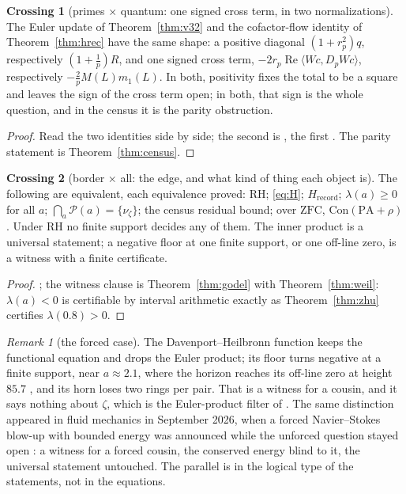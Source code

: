 \documentclass[11pt]{article}
\theoremstyle{definition}
\newtheorem{crossing}{Crossing}
\theoremstyle{remark}
\newtheorem{remark}[theorem]{Remark}
\newcommand{\PA}{\mathrm{PA}}
\newcommand{\ZFC}{\mathrm{ZFC}}
\newcommand{\Con}{\mathrm{Con}}
\newcommand{\PS}{\mathcal P}
\newcommand{\Hrec}{H_{\mathrm{record}}}
\newcommand{\Ree}{\operatorname{Re}}
\begin{document}
\begin{crossing}[primes $\times$ quantum: one signed cross term, in two normalizations]\label{cr:sign}
The Euler update of Theorem~\ref{thm:v32} and the cofactor-flow identity of Theorem~\ref{thm:hrec} have the same shape: a positive diagonal $(1+r_p^2)q$, respectively $(1+\tfrac1p)R$, and one signed cross term, $-2r_p\Ree\langle Wc,D_pWc\rangle$, respectively $-\tfrac2pM(L)m_1(L)$. In both, positivity fixes the total to be a square and leaves the sign of the cross term open; in both, that sign is the whole question, and in the census it is the parity obstruction.
\end{crossing}
\begin{proof}
Read the two identities side by side; the second is \cite[M44]{hrec}, the first \cite[\S3]{v32}. The parity statement is Theorem~\ref{thm:census}.
\end{proof}

\begin{crossing}[border $\times$ all: the edge, and what kind of thing each object is]\label{cr:edge}
The following are equivalent, each equivalence proved: $\mathrm{RH}$; \eqref{eq:H}; $\Hrec$; $\lambda(a)\ge0$ for all $a$; $\bigcap_a\PS(a)=\{\nu_\zeta\}$; the census residual bound; over $\ZFC$, $\Con(\PA+\rho)$. Under $\mathrm{RH}$ no finite support decides any of them. The inner product is a universal statement; a negative floor at one finite support, or one off-line zero, is a witness with a finite certificate.
\end{crossing}
\begin{proof}
\cite[Thm.\ 2.10, Prop.\ 2.11]{horizon}; the witness clause is Theorem~\ref{thm:godel} with Theorem~\ref{thm:weil}: $\lambda(a)<0$ is certifiable by interval arithmetic exactly as Theorem~\ref{thm:zhu} certifies $\lambda(0.8)>0$.
\end{proof}
\begin{remark}[the forced case]
The Davenport--Heilbronn function keeps the functional equation and drops the Euler product; its floor turns negative at a finite support, near $a\approx2.1$, where the horizon reaches its off-line zero at height $85.7$ \cite[Rem.\ 12.9]{folds}, and its horn loses two rings per pair. That is a witness for a cousin, and it says nothing about $\zeta$, which is the Euler-product filter of \cite{routes}. The same distinction appeared in fluid mechanics in September 2026, when a forced Navier--Stokes blow-up with bounded energy was announced while the unforced question stayed open \cite{ns}: a witness for a forced cousin, the conserved energy blind to it, the universal statement untouched. The parallel is in the logical type of the statements, not in the equations.
\end{remark}
\end{document}
